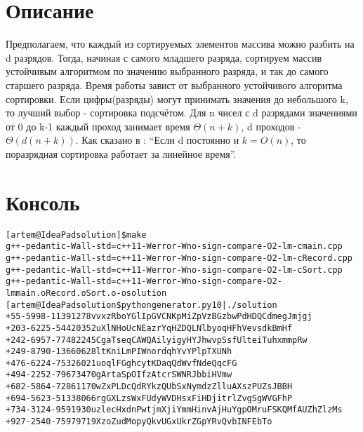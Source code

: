 \section{Описание}
Предполагаем, что каждый из сортируемых элементов массива можно разбить на d разрядов. Тогда, начиная с самого младшего разряда, сортируем массив устойчивым алгоритмом по значению выбранного разряда, и так до самого старшего разряда. Время работы завист от выбранного устойчивого алгоритма сортировки. Если цифры(разряды) могут принимать значения до небольшого k, то лучший выбор - сортировка подсчётом. Для n чисел с d разрядами значениями от 0 до k-1 каждый проход занимает время $\Theta(n+k)$, d проходов - $\Theta(d(n+k))$.
Как сказано в \cite{Kormen}: \enquote{Если d постоянно и $k = O(n)$, то поразрядная сортировка работает за линейное время}.

\pagebreak

\section{Консоль}
\begin{alltt}

[artem@IdeaPad solution]\$ make
g++ -pedantic -Wall -std=c++11 -Werror -Wno-sign-compare -O2 -lm -c main.cpp
g++ -pedantic -Wall -std=c++11 -Werror -Wno-sign-compare -O2 -lm -c Record.cpp
g++ -pedantic -Wall -std=c++11 -Werror -Wno-sign-compare -O2 -lm -c Sort.cpp
g++ -pedantic -Wall -std=c++11 -Werror -Wno-sign-compare -O2 -lm main.o Record.o Sort.o -o solution
[artem@IdeaPad solution\$ python generator.py 10 | ./solution 
+55-5998-11391278	vvxzRboYGlIpGVCNKpMiZpVzBGzbwPdHDQCdmegJmjgj
+203-6225-54420352	uXlNHoUcNEazrYqHZDQLNlbyoqHFhVevsdkBmHf
+242-6957-77482245	CgaTseqCAWQAilyigyHYJhwvpSsfUlteiTuhxmmpRw
+249-8790-13660628	ltKniLmPIWnordqhYvYPlpTXUNh
+476-6224-75326021	uoqlFGghcytKDaqQdWvfNdeQqcFG
+494-2252-79673470	gArtaSpOIfzAtcrSWNRJbbiHVmw
+682-5864-72861170	wZxPLDcQdRYkzQUbSxNymdzZlluAXszPUZsJBBH
+694-5623-51338066	rgGXLzsWxFUdyWVDHsxFiHDjitrlZvgSgWVGFhP
+734-3124-9591930	uzlecHxdnPwtjmXjiYmmHinvAjHuYgpOMruFSKQMfAUZhZlzMs
+927-2540-75979719	XzoZudMopyQkvUGxUkrZGpYRvQvbINFEbTo


\end{alltt}
\pagebreak
